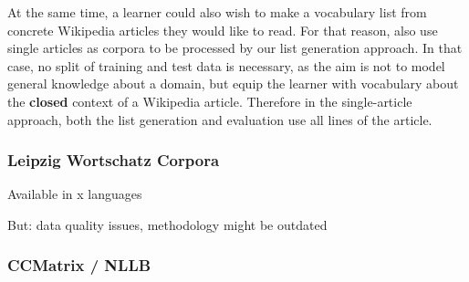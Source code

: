 At the same time, a learner could also wish to make a vocabulary list from concrete Wikipedia articles they would like to read.
For that reason, also use single articles as corpora to be processed by our list generation approach.
In that case, no split of training and test data is necessary, as the aim is not to model general knowledge about a domain, but equip the learner with vocabulary about the \textbf{closed} context of a Wikipedia article.
Therefore in the single-article approach, both the list generation and evaluation use all lines of the article.





\subsubsection{Leipzig Wortschatz Corpora}
Available in x languages

But: data quality issues, methodology might be outdated

\cite{goldhahnBuildingLargeMonolingual2012}

\subsubsection{CCMatrix / NLLB}

%

